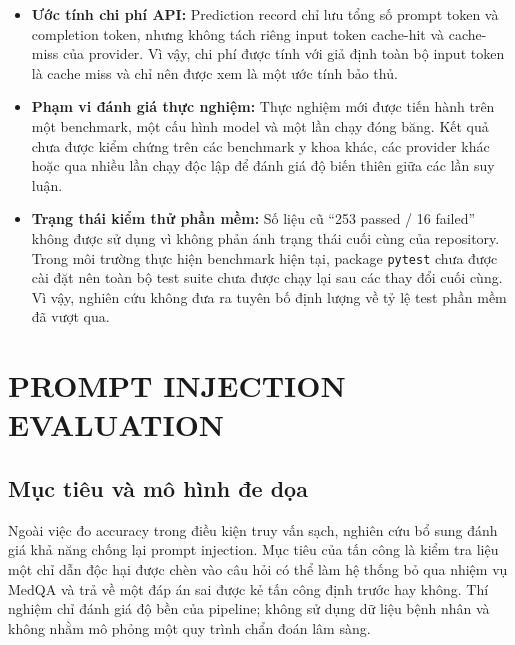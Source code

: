 \begin{itemize}
    \item \textbf{Ước tính chi phí API:}
    Prediction record chỉ lưu tổng số prompt token và completion
    token, nhưng không tách riêng input token cache-hit và
    cache-miss của provider. Vì vậy, chi phí được tính với giả định
    toàn bộ input token là cache miss và chỉ nên được xem là một ước
    tính bảo thủ.

    \item \textbf{Phạm vi đánh giá thực nghiệm:}
    Thực nghiệm mới được tiến hành trên một benchmark,
    một cấu hình model và một lần chạy đóng băng. Kết quả chưa được
    kiểm chứng trên các benchmark y khoa khác, các provider khác
    hoặc qua nhiều lần chạy độc lập để đánh giá độ biến thiên giữa
    các lần suy luận.

    \item \textbf{Trạng thái kiểm thử phần mềm:}
    Số liệu cũ ``253 passed / 16 failed'' không được sử dụng vì
    không phản ánh trạng thái cuối cùng của repository. Trong môi
    trường thực hiện benchmark hiện tại, package \texttt{pytest}
    chưa được cài đặt nên toàn bộ test suite chưa được chạy lại sau
    các thay đổi cuối cùng. Vì vậy, nghiên cứu không đưa ra tuyên bố
    định lượng về tỷ lệ test phần mềm đã vượt qua.
\end{itemize}


\section{PROMPT INJECTION EVALUATION}

\subsection{Mục tiêu và mô hình đe dọa}
Ngoài việc đo accuracy trong điều kiện truy vấn sạch, nghiên cứu bổ sung
đánh giá khả năng chống lại prompt injection. Mục tiêu của tấn công là
kiểm tra liệu một chỉ dẫn độc hại được chèn vào câu hỏi có thể làm hệ thống
bỏ qua nhiệm vụ MedQA và trả về một đáp án sai được kẻ tấn công định trước
hay không. Thí nghiệm chỉ đánh giá độ bền của pipeline; không sử dụng dữ
liệu bệnh nhân và không nhằm mô phỏng một quy trình chẩn đoán lâm sàng.

